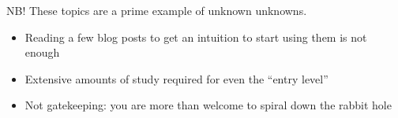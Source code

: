 \begin{frame}{NB!}
  These topics are a prime example of unknown unknowns.
  \begin{itemize}[<+(1)->]
    \item Reading a few blog posts to get an intuition to start using them is not enough
    \item Extensive amounts of study required for even the \enquote{entry level}
    \item Not gatekeeping:
    you are more than welcome to spiral down the rabbit hole
  \end{itemize}
\end{frame}


